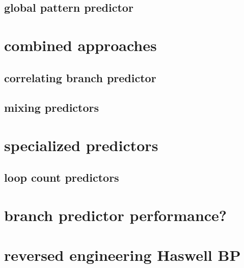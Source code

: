 \subsection{global pattern predictor}
 

\section{combined approaches}

\subsection{correlating branch predictor}

\subsection{mixing predictors}


\section{specialized predictors}
\subsection{loop count predictors}


\section{branch predictor performance?}


\section{reversed engineering Haswell BP}


